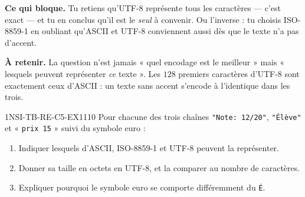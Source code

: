 

\textbf{Ce qui bloque.} Tu retiens qu'UTF-8 représente tous les caractères — c'est exact — et
tu en conclus qu'il est le \emph{seul} à convenir. Ou l'inverse : tu choisis ISO-8859-1 en
oubliant qu'ASCII et UTF-8 conviennent aussi dès que le texte n'a pas d'accent.

\textbf{À retenir.} La question n'est jamais « quel encodage est le meilleur » mais « lesquels
peuvent représenter \emph{ce} texte ». Les $128$ premiers caractères d'UTF-8 sont exactement
ceux d'ASCII : un texte sans accent s'encode à l'identique dans les trois.

\begin{exercice}{1NSI-TB-RE-C5-EX1}{1}{10}
Pour chacune des trois chaînes \lstinline{"Note: 12/20"}, \lstinline{"Élève"} et
« \lstinline{prix 15} » suivi du symbole euro :
\begin{enumerate}
  \item Indiquer lesquels d'ASCII, ISO-8859-1 et UTF-8 peuvent la représenter.
  \item Donner sa taille en octets en UTF-8, et la comparer au nombre de caractères.
  \item Expliquer pourquoi le symbole euro se comporte différemment du \lstinline{É}.
\end{enumerate}
\end{exercice}

